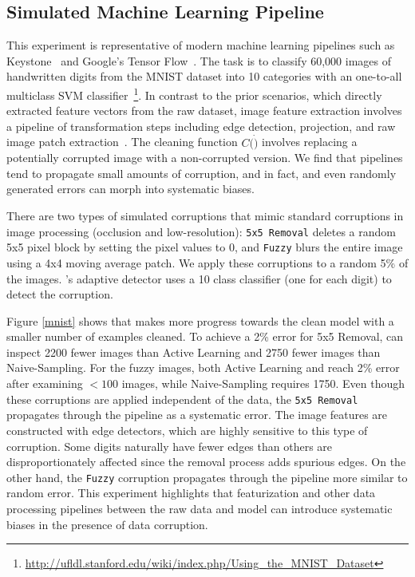 \subsection{Simulated Machine Learning Pipeline}
This experiment is representative of modern machine learning pipelines such as Keystone~\cite{keystone} and Google's Tensor Flow~\cite{tensor}. 
The task is to classify 60,000 images of handwritten digits from the MNIST dataset into 10 categories with an one-to-all multiclass SVM classifier~\footnote{\scriptsize\url{http://ufldl.stanford.edu/wiki/index.php/Using_the_MNIST_Dataset}}. 
In contrast to the prior scenarios, which directly extracted feature vectors from the raw dataset, image feature extraction involves a pipeline of transformation steps including edge detection, projection, and raw image patch extraction~\cite{keystone,tensor}.
The cleaning function $C(\dot)$ involves replacing a potentially corrupted image with a non-corrupted version.
We find that pipelines tend to propagate small amounts of corruption, and in fact, and even randomly generated errors can morph into systematic biases.

There are two types of simulated corruptions that mimic standard corruptions in image processing (occlusion and low-resolution): \texttt{5x5 Removal} deletes a random 5x5 pixel block by setting the pixel values to 0, and \texttt{Fuzzy} blurs the entire image using a 4x4 moving average patch. 
We apply these corruptions to a random 5\% of the images.
\sys's adaptive detector uses a 10 class classifier (one for each digit) to detect the corruption.

Figure \ref{mnist} shows that \sys makes more progress towards the clean model with a smaller number of examples cleaned.
To achieve a 2\% error for 5x5 Removal, \sys can inspect 2200 fewer images than Active Learning and 2750 fewer images than Naive-Sampling.
For the fuzzy images, both Active Learning and \sys reach 2\% error after examining $<100$ images, while Naive-Sampling requires 1750.
Even though these corruptions are applied independent of the data, the \texttt{5x5 Removal} propagates through the pipeline as a systematic error.
The image features are constructed with edge detectors, which are highly sensitive to this type of corruption.
Some digits naturally have fewer edges than others are disproportionately affected since the removal process adds spurious edges.
On the other hand, the \texttt{Fuzzy} corruption propagates through the pipeline more similar to random error.
This experiment highlights that featurization and other data processing pipelines between the raw data and model can introduce systematic biases in the presence of data corruption.

